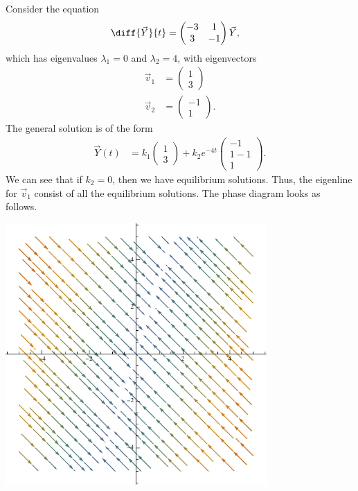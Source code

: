 \documentclass[10pt]{mypackage}
\begin{document}
\begin{example}
  Consider the equation
  \begin{align*}
    \diff{\vec{Y}}{t} &= \begin{pmatrix}-3 & 1 \\ 3 & -1\end{pmatrix}\vec{Y},
  \end{align*}
  which has eigenvalues $\lambda_1 = 0$ and $\lambda_2 = 4$, with eigenvectors
  \begin{align*}
    \vec{v}_1 &= \begin{pmatrix}1\\3\end{pmatrix}\\
    \vec{v}_2 &= \begin{pmatrix}-1\\1\end{pmatrix}.
  \end{align*}
  The general solution is of the form
  \begin{align*}
    \vec{Y}(t) &= k_1 \begin{pmatrix}1\\3\end{pmatrix} + k_2 e^{-4t}\begin{pmatrix}-1\\1-1\\1\end{pmatrix}.
  \end{align*}
  We can see that if $k_2 = 0$, then we have equilibrium solutions. Thus, the eigenline for $\vec{v}_1$ consist of all the equilibrium solutions. The phase diagram looks as follows.
  \begin{center}
    \includegraphics[width=10cm]{images/zero_eigenvalue.pdf}
  \end{center}
\end{example}
\end{document}
